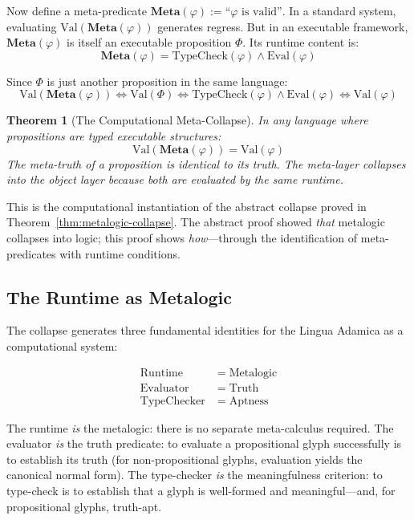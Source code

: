 \documentclass[12pt, letterpaper]{book}
\def\equiv{=}%
\newtheorem{theorem}{Theorem}[chapter]
\begin{document}
Now define a meta-predicate $\mathbf{Meta}(\varphi) := \text{``}\varphi\text{ is valid''}$. In a standard system, evaluating $\mathrm{Val}(\mathbf{Meta}(\varphi))$ generates regress. But in an executable framework, $\mathbf{Meta}(\varphi)$ is itself an executable proposition $\Phi$. Its runtime content is:
\[
\mathbf{Meta}(\varphi) \equiv \mathrm{TypeCheck}(\varphi) \land \mathrm{Eval}(\varphi)
\]

Since $\Phi$ is just another proposition in the same language:
\[
\mathrm{Val}(\mathbf{Meta}(\varphi)) \iff \mathrm{Val}(\Phi) \iff \mathrm{TypeCheck}(\varphi) \land \mathrm{Eval}(\varphi) \iff \mathrm{Val}(\varphi)
\]

\begin{theorem}[The Computational Meta-Collapse]\label{thm:comp-collapse}
In any language where propositions are typed executable structures:
\[
\boxed{\mathrm{Val}(\mathbf{Meta}(\varphi)) \equiv \mathrm{Val}(\varphi)}
\]
The meta-truth of a proposition is identical to its truth. The meta-layer collapses into the object layer because both are evaluated by the same runtime.
\end{theorem}

This is the computational instantiation of the abstract collapse proved in Theorem~\ref{thm:metalogic-collapse}. The abstract proof showed \textit{that} metalogic collapses into logic; this proof shows \textit{how}---through the identification of meta-predicates with runtime conditions.

\subsection{The Runtime as Metalogic}

The collapse generates three fundamental identities for the Lingua Adamica as a computational system:

\begin{align}
\mathrm{Runtime} &\equiv \mathrm{Metalogic} \label{eq:runtime-metalogic} \\
\mathrm{Evaluator} &\equiv \mathrm{Truth} \label{eq:eval-truth} \\
\mathrm{TypeChecker} &\equiv \mathrm{Aptness} \label{eq:type-apt}
\end{align}

The runtime \textit{is} the metalogic: there is no separate meta-calculus required. The evaluator \textit{is} the truth predicate: to evaluate a propositional glyph successfully is to establish its truth (for non-propositional glyphs, evaluation yields the canonical normal form). The type-checker \textit{is} the meaningfulness criterion: to type-check is to establish that a glyph is well-formed and meaningful---and, for propositional glyphs, truth-apt.
\end{document}
